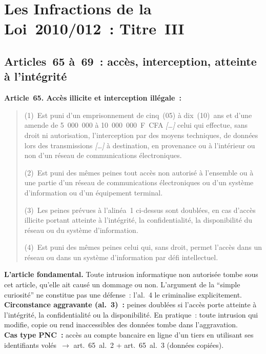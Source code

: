 \section{Les Infractions de la Loi~2010/012~: Titre~III}
\label{sec:infractions-loi2010}

\subsection{Articles~65 à~69~: accès, interception, atteinte à l'intégrité}

\begin{boxjuris}
\textbf{Article~65. Accès illicite et interception illégale~:}
\begin{quote}
(1)~Est puni d'un emprisonnement de cinq~(05) à dix~(10)~ans et d'une
amende de 5~000~000 à 10~000~000~F~CFA \textit{[\ldots]} celui qui effectue,
sans droit ni autorisation, l'interception par des moyens techniques, de
données lors des transmissions \textit{[\ldots]} à destination, en provenance
ou à l'intérieur ou non d'un réseau de communications électroniques.

(2)~Est puni des mêmes peines tout accès non autorisé à l'ensemble ou à
une partie d'un réseau de communications électroniques ou d'un système
d'information ou d'un équipement terminal.

(3)~Les peines prévues à l'alinéa~1 ci-dessus sont doublées, en cas
d'accès illicite portant atteinte à l'intégrité, la confidentialité,
la disponibilité du réseau ou du système d'information.

(4)~Est puni des mêmes peines celui qui, sans droit, permet l'accès dans
un réseau ou dans un système d'information par défi intellectuel.
\end{quote}
\textbf{L'article fondamental.} Toute intrusion informatique non autorisée
tombe sous cet article, qu'elle ait causé un dommage ou non. L'argument
de la ``simple curiosité'' ne constitue pas une défense~: l'al.~4 le
criminalise explicitement.\\[0.3ex]
\textbf{Circonstance aggravante (al.~3)~:} peines doublées si l'accès porte
atteinte à l'intégrité, la confidentialité ou la disponibilité.
En pratique~: toute intrusion qui modifie, copie ou rend inaccessibles
des données tombe dans l'aggravation.\\[0.3ex]
\textbf{Cas type PNC~:} accès au compte bancaire en ligne d'un tiers en
utilisant ses identifiants volés~$\to$ art.~65~al.~2 + art.~65~al.~3
(données copiées).
\end{boxjuris}

